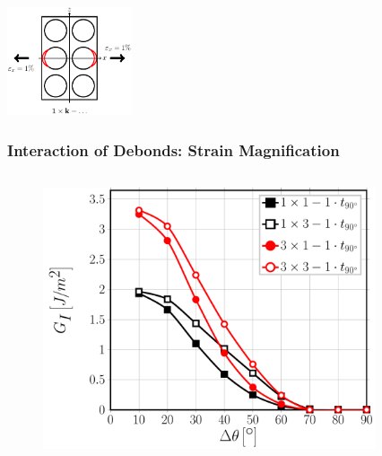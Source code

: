 \documentclass[first,firstsupp,lastsupp,last,hyperref,table]{ETHclass}
\begin{document}
\begin{frame}
\begin{columns}[c]
\begin{column}{0.5\textwidth}
\begin{figure}
\end{figure}
\end{column}
\end{columns}
\vspace{-0.25cm}
\includegraphics[width=0.275\textwidth]{twofibers-sameside-strainmagni1.pdf}
\end{frame}

\addtocounter{framenumber}{-1}

\begin{frame}
\frametitle{\vspace{0.2cm}\small Interaction of Debonds: Strain Magnification}
\vspace{-.75cm}
\centering
\begin{columns}[c]
\centering
\begin{column}{0.5\textwidth}
\centering
\begin{figure}
\centering
\includegraphics[width=\columnwidth]{nxk-1-vf60-GI-strainmagni3.pdf}
\end{figure}
\end{column}
\begin{column}{0.5\textwidth}
\centering
\begin{figure}
\centering

\end{figure}
\end{column}
\end{columns}
\end{frame}
\end{document}
